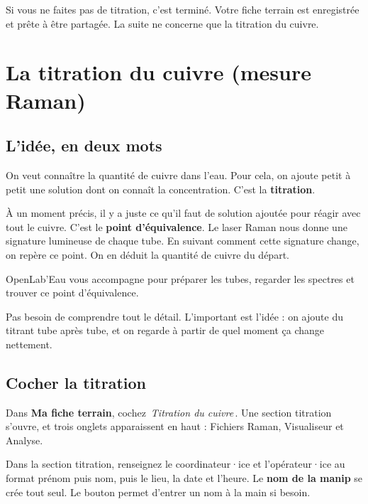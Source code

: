 \documentclass[12pt, a4paper]{article}
\newcommand{\bouton}[1]{%
  \tikz[baseline=(b.base)]{%
    \node[rounded corners=3pt, fill=darkgray!12, draw=darkgray!35,
          inner xsep=5pt, inner ysep=2pt,
          font=\small\bfseries\color{darkgray}] (b) {#1};}%
}
\newcommand{\onglet}[1]{\textbf{\color{mainblue}#1}}
\newcommand{\champ}[1]{\textit{\color{accentteal}\og\,#1\,\fg{}}}
\begin{document}
\begin{enresume}
  Si vous ne faites pas de titration, c'est terminé. Votre fiche terrain
  est enregistrée et prête à être partagée. La suite ne concerne que la
  titration du cuivre.
\end{enresume}

\newpage

\section{La titration du cuivre (mesure Raman)}

\subsection{L'idée, en deux mots}

On veut connaître la quantité de cuivre dans l'eau. Pour cela, on ajoute
petit à petit une solution dont on connaît la concentration. C'est la
\textbf{titration}.

À un moment précis, il y a juste ce qu'il faut de solution ajoutée pour
réagir avec tout le cuivre. C'est le \textbf{point d'équivalence}. Le
laser Raman nous donne une signature lumineuse de chaque tube. En suivant
comment cette signature change, on repère ce point. On en déduit la
quantité de cuivre du départ.

OpenLab'Eau vous accompagne pour préparer les tubes, regarder les spectres
et trouver ce point d'équivalence.

\begin{conseil}
  Pas besoin de comprendre tout le détail. L'important est l'idée : on
  ajoute du titrant tube après tube, et on regarde à partir de quel moment
  ça change nettement.
\end{conseil}

\subsection{Cocher la titration}

Dans \onglet{Ma fiche terrain}, cochez \champ{Titration du cuivre}. Une
section titration s'ouvre, et trois onglets apparaissent en haut :
Fichiers Raman, Visualiseur et Analyse.

Dans la section titration, renseignez le coordinateur·ice et
l'opérateur·ice au format prénom puis nom, puis le lieu, la date et
l'heure. Le \textbf{nom de la manip} se crée tout seul. Le bouton
\bouton{Modifier} permet d'entrer un nom à la main si besoin.
\end{document}
